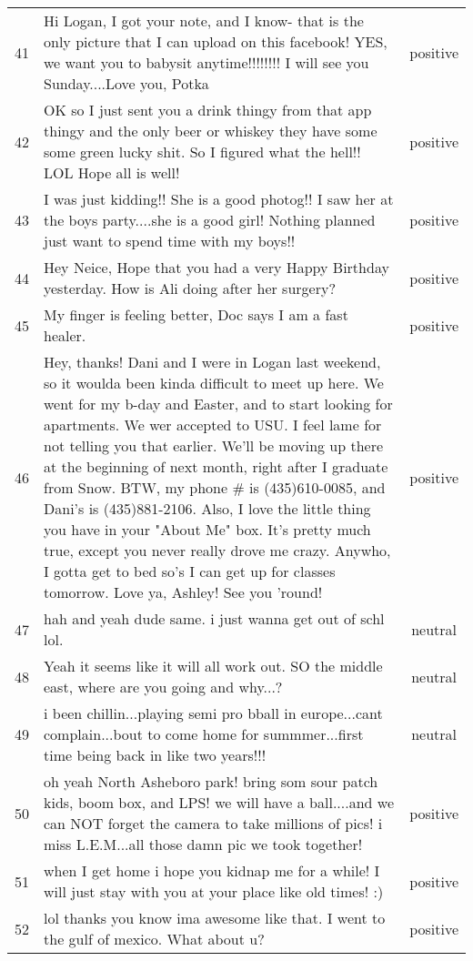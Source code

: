 \begin{center}
\begin{footnotesize}
\begin{longtable}{cp{3.8in}c}
41 & Hi Logan, I got your note, and I know- that is the only picture that I can upload on this facebook! YES, we want you to babysit anytime!!!!!!!! I will see you Sunday....Love you, Potka & positive\\
42 & OK so I just sent you a drink thingy from that app thingy and the only beer or whiskey they have some some green lucky shit. So I figured what the hell!! LOL Hope all is well! & positive\\
43 & I was just kidding!! She is a good photog!! I saw her at the boys party....she is a good girl! Nothing planned just want to spend time with my boys!! & positive\\
44 & Hey Neice, Hope that you had a very Happy Birthday yesterday. How is Ali doing after her surgery? & positive\\
45 & My finger is feeling better, Doc says I am a fast healer. & positive\\
46 & Hey, thanks!  Dani and I were in Logan last weekend, so it woulda been kinda difficult to meet up here.  We went for my b-day and Easter, and to start looking for apartments.  We wer accepted to USU.  I feel lame for not telling you that earlier.  We'll be moving up there at the beginning of next month, right after I graduate from Snow.  BTW, my phone \# is (435)610-0085, and Dani's is (435)881-2106.  Also, I love the little thing you have in your "About Me" box.  It's pretty much true, except you never really drove me crazy.  Anywho, I gotta get to bed so's I can get up for classes tomorrow.  Love ya, Ashley!  See you 'round! & positive\\
47 & hah and yeah dude same. i just wanna get out of schl lol. & neutral\\
48 & Yeah it seems like it will all work out.  SO the middle east, where are you going and why...? & neutral\\
49 & i been chillin...playing semi pro bball in europe...cant complain...bout to come home for summmer...first time being back in like two years!!! & neutral\\
50 & oh yeah North Asheboro park! bring som sour patch kids, boom box, and LPS! we will have a ball....and we can NOT forget the camera to take millions of pics! i miss L.E.M...all those damn pic we took together!  & positive\\
51 & when I get home i hope you kidnap me for a while! I will just stay with you at your place like old times! :) & positive\\
52 & lol thanks you know ima awesome like that. I went to the gulf of mexico. What about u? & positive\\

\end{longtable}
\end{footnotesize}
\end{center}

